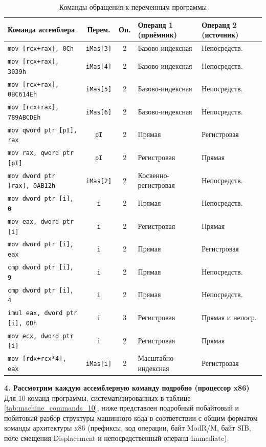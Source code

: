 \documentclass[14pt, a4paper]{extarticle}
\begin{document}
	\begin{table}[H]
		\centering
		\caption{Команды обращения к переменным программы} \label{tab:instructions_analysis}
		\begin{tabularx}{\textwidth}{|p{5.2cm}|c|c|X|X|}
			\hline
			\textbf{Команда ассемблера} & \textbf{Перем.} & \textbf{Оп.} & \textbf{Операнд 1 (приёмник)} & \textbf{Операнд 2 (источник)} \\ \hline
			\texttt{mov [rcx+rax], 0Ch} & \texttt{iMas[3]} & 2 & Базово-индексная & Непосредств. \\ \hline
			\texttt{mov [rcx+rax], 3039h} & \texttt{iMas[4]} & 2 & Базово-индексная & Непосредств. \\ \hline
			\texttt{mov [rcx+rax], 0BC614Eh} & \texttt{iMas[5]} & 2 & Базово-индексная & Непосредств. \\ \hline
			\texttt{mov [rcx+rax], 789ABCDEh} & \texttt{iMas[6]} & 2 & Базово-индексная & Непосредств. \\ \hline
			\texttt{mov qword ptr [pI], rax} & \texttt{pI} & 2 & Прямая & Регистровая \\ \hline
			\texttt{mov rax, qword ptr [pI]} & \texttt{pI} & 2 & Регистровая & Прямая \\ \hline
			\texttt{mov dword ptr [rax], 0AB12h} & \texttt{iMas[2]} & 2 & Косвенно-регистровая & Непосредств. \\ \hline
			\texttt{mov dword ptr [i], 0} & \texttt{i} & 2 & Прямая & Непосредств. \\ \hline
			\texttt{mov eax, dword ptr [i]} & \texttt{i} & 2 & Регистровая & Прямая \\ \hline
			\texttt{mov dword ptr [i], eax} & \texttt{i} & 2 & Прямая & Регистровая \\ \hline
			\texttt{cmp dword ptr [i], 9} & \texttt{i} & 2 & Прямая & Непосредств. \\ \hline
			\texttt{cmp dword ptr [i], 4} & \texttt{i} & 2 & Прямая & Непосредств. \\ \hline
			\texttt{imul eax, dword ptr [i], 0Dh} & \texttt{i} & 3 & Регистровая & Прямая и непоср. \\ \hline
			\texttt{mov ecx, dword ptr [i]} & \texttt{i} & 2 & Регистровая & Прямая \\ \hline
			\texttt{mov [rdx+rcx*4], eax} & \texttt{iMas[i]} & 2 & Масштабно-индексная & Регистровая \\ \hline
		\end{tabularx}
	\end{table}


	\noindent \textbf{4. Рассмотрим каждую ассемблерную команду подробно (процессор x86)}\\[3mm]
	Для 10 команд программы, систематизированных в таблице \ref{tab:machine_commands_10}, ниже представлен подробный побайтовый и побитовый разбор структуры машинного кода в соответствии с общим форматом команды архитектуры x86 (префиксы, код операции, байт ModR/M, байт SIB, поле смещения Displacement и непосредственный операнд Immediate).
\end{document}
